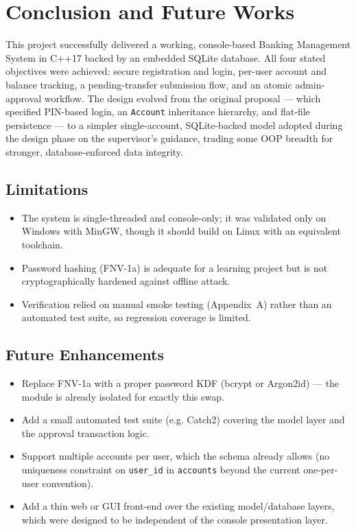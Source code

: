 \chapter{Conclusion and Future Works}

This project successfully delivered a working, console-based Banking Management System in C++17 backed by an embedded SQLite database. All four stated objectives were achieved: secure registration and login, per-user account and balance tracking, a pending-transfer submission flow, and an atomic admin-approval workflow. The design evolved from the original proposal --- which specified PIN-based login, an \texttt{Account} inheritance hierarchy, and flat-file persistence --- to a simpler single-account, SQLite-backed model adopted during the design phase on the supervisor's guidance, trading some OOP breadth for stronger, database-enforced data integrity.

\section{Limitations}
\begin{itemize}
    \item The system is single-threaded and console-only; it was validated only on Windows with MinGW, though it should build on Linux with an equivalent toolchain.
    \item Password hashing (FNV-1a) is adequate for a learning project but is not cryptographically hardened against offline attack.
    \item Verification relied on manual smoke testing (Appendix~A) rather than an automated test suite, so regression coverage is limited.
\end{itemize}

\section{Future Enhancements}
\begin{itemize}
    \item Replace FNV-1a with a proper password KDF (bcrypt or Argon2id) --- the module is already isolated for exactly this swap.
    \item Add a small automated test suite (e.g. Catch2) covering the model layer and the approval transaction logic.
    \item Support multiple accounts per user, which the schema already allows (no uniqueness constraint on \texttt{user\_id} in \texttt{accounts} beyond the current one-per-user convention).
    \item Add a thin web or GUI front-end over the existing model/database layers, which were designed to be independent of the console presentation layer.
\end{itemize}